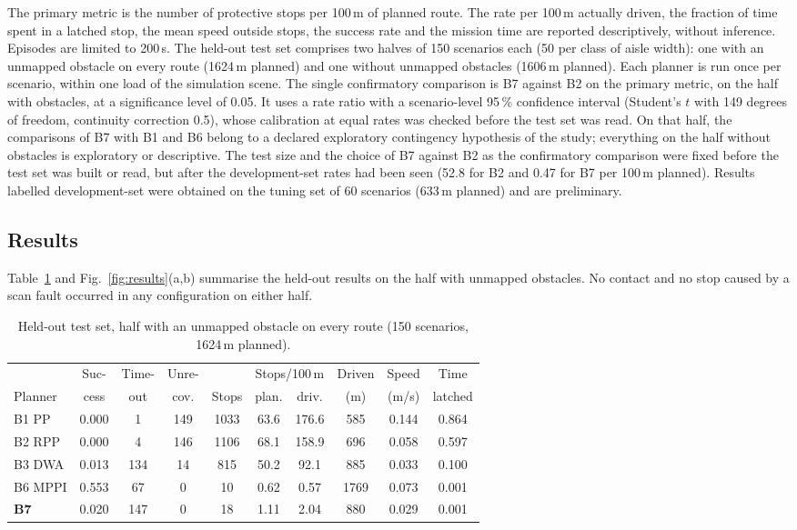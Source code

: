 \documentclass[conference]{IEEEtran}
\begin{document}
The primary metric is the number of protective stops per 100\,m of planned route. The rate per 100\,m
actually driven, the fraction of time spent in a latched stop, the mean speed outside stops, the success
rate and the mission time are reported descriptively, without inference. Episodes are limited to 200\,s.
The held-out test set comprises two halves of 150 scenarios each (50 per class of aisle width): one with an
unmapped obstacle on every route (1624\,m planned) and one without unmapped obstacles (1606\,m planned). Each planner is run once per scenario, within one load of the simulation scene. The single confirmatory comparison is B7 against B2 on the primary metric, on the half with obstacles, at a significance level of 0.05. It uses a rate
ratio with a scenario-level 95\,\% confidence interval (Student's $t$ with 149 degrees of freedom,
continuity correction 0.5), whose calibration at equal rates was checked before the test set was read. On that half, the comparisons of B7 with B1 and B6 belong to a declared exploratory contingency hypothesis of
the study; everything on the half without obstacles is exploratory or descriptive. The
test size and the choice of B7 against B2 as the confirmatory comparison were fixed before the test set was
built or read, but after the development-set rates had been seen (52.8 for B2 and 0.47 for B7 per 100\,m
planned). Results labelled development-set were obtained on the tuning set of 60 scenarios (633\,m planned)
and are preliminary.

\subsection{Results}
Table~\ref{tab:main} and Fig.~\ref{fig:results}(a,b) summarise the held-out results on the half with unmapped obstacles. No contact and no stop caused by a scan
fault occurred in any configuration on either half.

\begin{table}[t]
\centering
\caption{Held-out test set, half with an unmapped obstacle on every route (150 scenarios, 1624\,m planned).}
\label{tab:main}
\footnotesize
\setlength{\tabcolsep}{2.2pt}
\begin{tabular}{lccccccccc}
\toprule
 & Suc- & Time- & Unre- & & \multicolumn{2}{c}{Stops/100\,m} & Driven & Speed & Time \\
Planner & cess & out & cov. & Stops & plan. & driv. & (m) & (m/s) & latched \\
\midrule
B1 PP & 0.000 & 1 & 149 & 1033 & 63.6 & 176.6 & 585 & 0.144 & 0.864 \\
B2 RPP & 0.000 & 4 & 146 & 1106 & 68.1 & 158.9 & 696 & 0.058 & 0.597 \\
B3 DWA & 0.013 & 134 & 14 & 815 & 50.2 & 92.1 & 885 & 0.033 & 0.100 \\
B6 MPPI & 0.553 & 67 & 0 & 10 & 0.62 & 0.57 & 1769 & 0.073 & 0.001 \\
\textbf{B7} & 0.020 & 147 & 0 & 18 & 1.11 & 2.04 & 880 & 0.029 & 0.001 \\
\bottomrule
\end{tabular}
\end{table}
\end{document}
